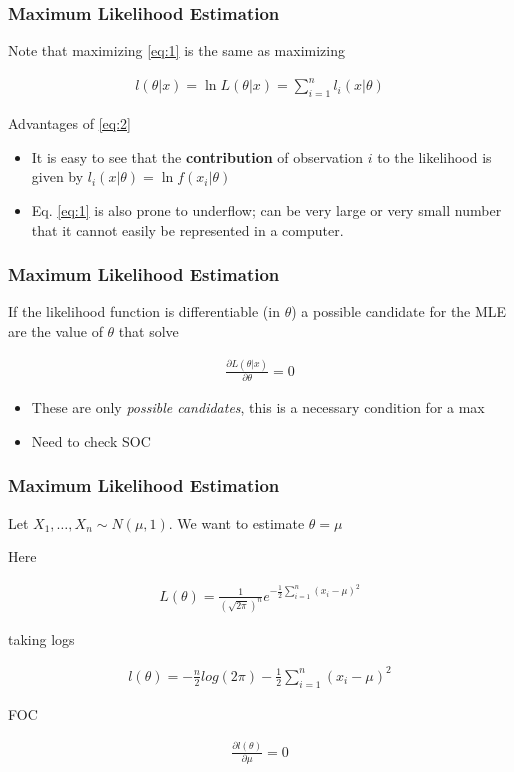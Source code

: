\documentclass[
  shownotes,
  xcolor={svgnames},
  hyperref={colorlinks,citecolor=DarkBlue,linkcolor=DarkRed,urlcolor=DarkBlue}
  ]{beamer}
\begin{document}
\begin{frame}[fragile]
\frametitle{Maximum Likelihood Estimation}
Note that maximizing \eqref{eq:1} is the same as maximizing

\begin{align}\label{eq:2}
l(\theta|x)=\ln L(\theta|x)=\sum_{i=1}^n l_i(x|\theta)
\end{align}

\bigskip
Advantages of \eqref{eq:2}
\begin{itemize}
\item It is easy to see that the {\bf contribution} of observation $i$ to the likelihood is given by $l_i(x|\theta)=\ln f(x_i|\theta)$
\item Eq. \eqref{eq:1} is also prone to underflow; can be very large or very small number that it cannot easily be represented in a computer. 
\end{itemize}

\end{frame}


\begin{frame}[fragile]
\frametitle{Maximum Likelihood Estimation}
If the likelihood function is differentiable (in $\theta$) a possible candidate for the MLE are the value of $\theta$ that solve

\begin{align}
  \frac{\partial L(\theta|x)}{\partial \theta} = 0
\end{align}

\begin{itemize}
\item These are  only {\it possible candidates}, this is a necessary condition for a max
\item Need to check SOC
\end{itemize}

\end{frame}

\begin{frame}[fragile]
\frametitle{Maximum Likelihood Estimation}

 Let $X_1,\dots,X_n \sim N(\mu,1)$. We want to estimate $\theta = \mu$

Here

\begin{align}
L(\theta)=\frac{1}{(\sqrt{2\pi})^{n}}e^{-\frac{1}{2}\sum_{i=1}^{n}(x_i-\mu)^2}
\end{align}


taking logs 

\begin{align}
l\left(\theta\right)=-\frac{n}{2}log\left(2\pi\right)-\frac{1}{2}\sum_{i=1}^{n}(x_i-\mu)^2
\end{align}

FOC

\begin{align}
\frac{\partial l\left(\theta\right)}{\partial\mu}=0
\end{align}


\end{frame}
\end{document}

